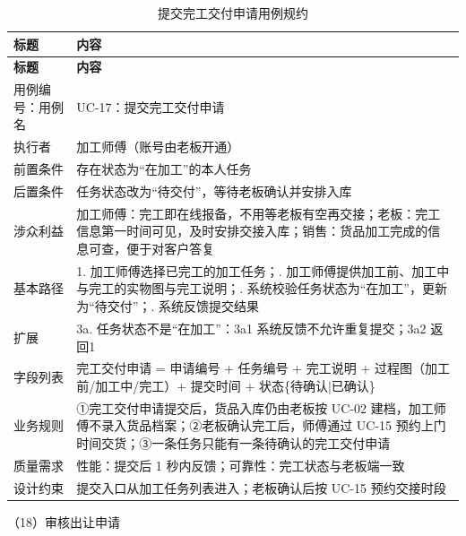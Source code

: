\documentclass[12pt, a4paper]{ctexart}
\begin{document}
{\small
\begin{longtable}{@{}p{2.4cm} p{12.9cm}@{}}
\caption{提交完工交付申请用例规约}\label{tab:uc-17}\\
\toprule
\textbf{标题} & \textbf{内容} \\
\midrule
\endfirsthead
\toprule
\textbf{标题} & \textbf{内容} \\
\midrule
\endhead
用例编号：用例名 & UC-17：提交完工交付申请 \\
\midrule
执行者 & 加工师傅（账号由老板开通） \\
\midrule
前置条件 & 存在状态为“在加工”的本人任务 \\
\midrule
后置条件 & 任务状态改为“待交付”，等待老板确认并安排入库 \\
\midrule
涉众利益 & 加工师傅：完工即在线报备，不用等老板有空再交接；\newline 老板：完工信息第一时间可见，及时安排交接入库；\newline 销售：货品加工完成的信息可查，便于对客户答复 \\
\midrule
基本路径 & 1. 加工师傅选择已完工的加工任务；\newline 2. 加工师傅提供加工前、加工中与完工的实物图与完工说明；\newline 3. 系统校验任务状态为“在加工”，更新为“待交付”；\newline 4. 系统反馈提交结果 \\
\midrule
扩展 & 3a. 任务状态不是“在加工”：3a1 系统反馈不允许重复提交；3a2 返回1 \\
\midrule
字段列表 & 完工交付申请 = 申请编号 + 任务编号 + 完工说明 + 过程图（加工前/加工中/完工）+ 提交时间 + 状态\{待确认|已确认\} \\
\midrule
业务规则 & ①完工交付申请提交后，货品入库仍由老板按 UC-02 建档，加工师傅不录入货品档案；\newline ②老板确认完工后，师傅通过 UC-15 预约上门时间交货；\newline ③一条任务只能有一条待确认的完工交付申请 \\
\midrule
质量需求 & 性能：提交后 1 秒内反馈；\newline 可靠性：完工状态与老板端一致 \\
\midrule
设计约束 & 提交入口从加工任务列表进入；老板确认后按 UC-15 预约交接时段 \\
\midrule
\bottomrule
\end{longtable}}
\noindent（18）审核出让申请
\end{document}
